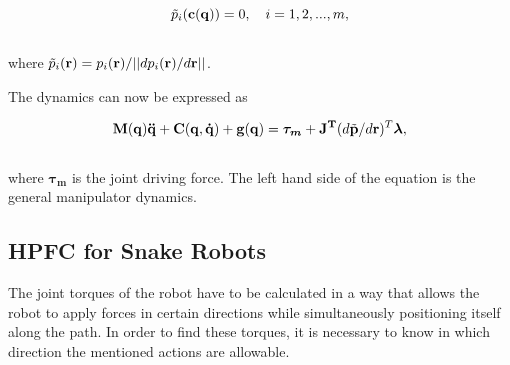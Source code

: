 \begin{equation}
    \Tilde{p}_i(\mathbf{c(q)}) = 0, \quad i = 1, 2, ..., m,
\end{equation}
\\
where $\Tilde{p}_i(\mathbf{r}) = p_i(\mathbf{r})/||dp_i(\mathbf{r})/d\mathbf{r}||$.

The dynamics can now be expressed as

\begin{equation}
    \mathbf{M(q)\ddot{q} + C(q,\dot{q}) + g(q)} = \boldsymbol{\tau_m} + \mathbf{J^T}(d\Tilde{\mathbf{p}}/d\mathbf{r})^T \boldsymbol{\lambda},
\end{equation}
\\
where $\boldsymbol{\tau_m}$ is the joint driving force. The left hand side of the equation is the general manipulator dynamics.



\subsection{HPFC for Snake Robots}\label{subseq:snakeHPFC}


The joint torques of the robot have to be calculated in a way that allows the robot to apply forces in certain directions while simultaneously positioning itself along the path. In order to find these torques, it is necessary to know in which direction the mentioned actions are allowable.

